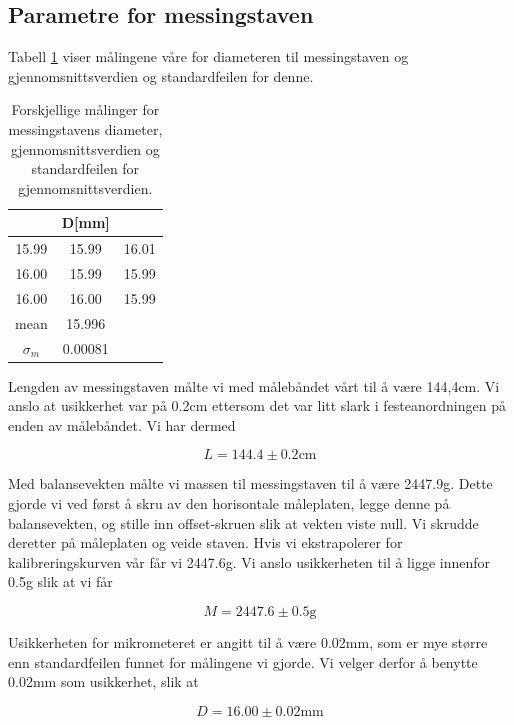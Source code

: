 \documentclass[a4paper,11pt, twocolumn]{article}
\begin{document}
\subsection{Parametre for messingstaven}
Tabell \ref{tab:diameter} viser målingene våre for diameteren til messingstaven og gjennomsnittsverdien og standardfeilen for denne.

\begin{table}[!ht]
\centering
\caption{Forskjellige målinger for messingstavens diameter, gjennomsnittsverdien og standardfeilen for gjennomsnittsverdien.}
\label{tab:diameter}
\begin{tabular}{ccc}
	\toprule
	\toprule
	 & D[mm]&\\
	\hline
	15.99 & 15.99 & 16.01\\
	16.00 & 15.99 & 15.99\\
	16.00 & 16.00 & 15.99\\
	\hline
	mean & 15.996 &\\
	$\sigma_m$ & 0.00081&\\
	\toprule
\end{tabular}
\end{table}

Lengden av messingstaven målte vi med målebåndet vårt til å være 144,4cm. Vi anslo at usikkerhet var på 0.2cm ettersom det var litt slark i festeanordningen på enden av målebåndet. Vi har dermed 

\begin{equation}
L=144.4\pm0.2\text{cm} 
\end{equation}

Med balansevekten målte vi massen til messingstaven til å være 2447.9g.  Dette gjorde vi ved først å skru av den horisontale måleplaten, legge denne på balansevekten, og stille inn offset-skruen slik at vekten viste null. Vi skrudde deretter på måleplaten og veide staven. Hvis vi ekstrapolerer for kalibreringskurven vår får vi 2447.6g. Vi anslo usikkerheten til å ligge innenfor 0.5g slik at vi får

\begin{equation}
	M = 2447.6\pm0.5\text{g}
\end{equation} 

Usikkerheten for mikrometeret er angitt til å være 0.02mm, som er mye større enn standardfeilen funnet for målingene vi gjorde. Vi velger derfor å benytte 0.02mm som usikkerhet, slik at

\begin{equation}
	D = 16.00\pm0.02\text{mm}
\end{equation}
\end{document}

